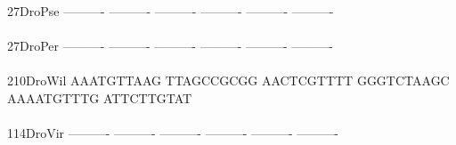 \documentclass[11pt,twoside,reqno,a4paper]{article}
\begin{document}
{27\hspace*{3\charwidth}DroPse	----------	----------	----------	----------	----------	----------	\\
\hspace*{5\charwidth}\hspace*{7\charwidth}\hspace*{1\charwidth}\hspace*{1\charwidth}\hspace*{1\charwidth}\hspace*{1\charwidth}\hspace*{1\charwidth}\hspace*{1\charwidth}\\
27\hspace*{3\charwidth}DroPer	----------	----------	----------	----------	----------	----------	\\
\hspace*{5\charwidth}\hspace*{7\charwidth}\hspace*{1\charwidth}\hspace*{1\charwidth}\hspace*{1\charwidth}\hspace*{1\charwidth}\hspace*{1\charwidth}\hspace*{1\charwidth}\\
210\hspace*{2\charwidth}DroWil	AAATGTTAAG	TTAGCCGCGG	AACTCGTTTT	GGGTCTAAGC	AAAATGTTTG	ATTCTTGTAT	\\
\hspace*{5\charwidth}\hspace*{7\charwidth}\hspace*{1\charwidth}\hspace*{1\charwidth}\hspace*{1\charwidth}\hspace*{1\charwidth}\hspace*{1\charwidth}\hspace*{1\charwidth}\\
114\hspace*{2\charwidth}DroVir	----------	----------	----------	----------	----------	----------	\\
\hspace*{5\charwidth}\hspace*{7\charwidth}\hspace*{1\charwidth}\hspace*{1\charwidth}\hspace*{1\charwidth}\hspace*{1\charwidth}\hspace*{1\charwidth}\hspace*{1\charwidth}\\
}
\end{document}
